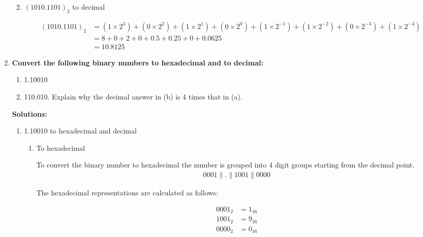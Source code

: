 \documentclass{article}
\begin{document}
\begin{enumerate}[label=\textbf{\arabic*.}]
\begin{enumerate}[label=\textbf{\alph*.}]
        \newpage
        \item \((1010.1101)_2\) to decimal \newline
        
        \begin{align*}
            (1010.1101)_2 &= (1 \times 2^3) + (0 \times 2^2) + (1 \times 2^1) + (0 \times 2^0) + (1 \times 2^{-1}) + (1 \times 2^{-2}) + (0 \times 2^{-3}) + (1 \times 2^{-4}) \\
            &= 8 + 0 + 2 + 0 + 0.5 + 0.25+ 0 + 0.0625 \\
            &= 10.8125
        \end{align*}

    \end{enumerate}

    \item \textbf{Convert the following binary numbers to hexadecimal and to decimal:} \newline
    
    \begin{enumerate}[label=\textbf{\alph*.}]
        \item 1.10010
        \item 110.010. Explain why the decimal answer in (b) is 4 times that in (a).
    \end{enumerate}

    \textbf{Solutions:} \newline

    \begin{enumerate}[label=\textbf{\alph*.}]
        \item 1.10010 to hexadecimal and decimal \newline
        \begin{enumerate}[label=\textbf{\roman*.}]
            \item To hexadecimal \newline
            
            To convert the binary number to hexadecimal the number is grouped into 4 digit groups starting from the decimal point. \newline
            \begin{align*}
                0001 \parallel . \parallel 1001 \parallel 0000
            \end{align*}

            The hexadecimal representations are calculated as follows: \newline

            \begin{align*}
                0001_2 &= 1_{16} \\
                1001_2 &= 9_{16} \\
                0000_2 &= 0_{16}
            \end{align*}
            

\end{enumerate}
\end{enumerate}
\end{enumerate}
\end{document}

